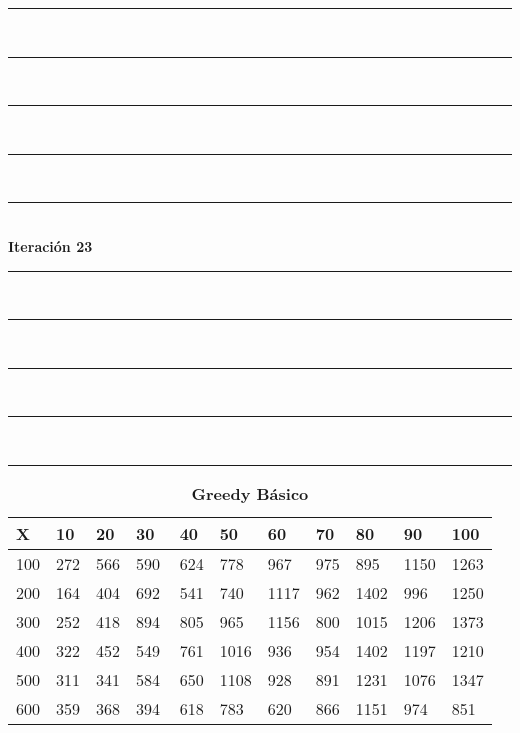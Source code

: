 \documentclass[10pt,letterpaper]{article}
\begin{document}
\newpage 
\begin{center}
\newcommand{\HRule}{\rule{\linewidth}{0.5mm}}
\center
\HRule\\[6cm]
\HRule\\[0.4cm]
\HRule\\[0.4cm]
\HRule\\[0.4cm]
\HRule\\[0.4cm]
{\centering \Huge\bfseries Iteración 23}\\[0.4cm]
\HRule\\[0.4cm]
\HRule\\[0.4cm]
\HRule\\[0.4cm]
\HRule\\[6cm]
\HRule
\end{center}
\newpage 
{}
\begin{center}
\begin{table}\renewcommand{\arraystretch}{2.5}
\caption{\large \textbf{Greedy Básico}}
\centering
\begin{tabular} { |m{0.5cm}|m{1.3cm}|m{1.3cm}|m{1.3cm}|m{1.3cm}|m{1.3cm}|m{1.3cm}|m{1.3cm}|m{1.3cm}|m{1.3cm}|m{1.3cm}|} 
\hline
\rowcolor{Gray}
\centering \textbf{X} & \centering \textbf{10} & \centering \textbf{20} & \centering \textbf{30}\ & \centering \textbf{40} & \centering \textbf{50} & \centering \textbf{60}\ & \centering \textbf{70} & \centering \textbf{80} & \centering \textbf{90}\ & \textbf{100} \\\hline
\cellcolor{Gray}100 & \Large 272 & \Large 566 & \Large 590 & \Large 624 & \Large 778 & \Large 967 & \Large 975 & \Large 895 & \Large 1150 & \Large 1263 \\
\hline
\cellcolor{Gray}200 & \Large 164 & \Large 404 & \Large 692 & \Large 541 & \Large 740 & \Large 1117 & \Large 962 & \Large 1402 & \Large 996 & \Large 1250 \\
\hline
\cellcolor{Gray}300 & \Large 252 & \Large 418 & \Large 894 & \Large 805 & \Large 965 & \Large 1156 & \Large 800 & \Large 1015 & \Large 1206 & \Large 1373 \\
\hline
\cellcolor{Gray}400 & \Large 322 & \Large 452 & \Large 549 & \Large 761 & \Large 1016 & \Large 936 & \Large 954 & \Large 1402 & \Large 1197 & \Large 1210 \\
\hline
\cellcolor{Gray}500 & \Large 311 & \Large 341 & \Large 584 & \Large 650 & \Large 1108 & \Large 928 & \Large 891 & \Large 1231 & \Large 1076 & \Large 1347 \\
\hline
\cellcolor{Gray}600 & \Large 359 & \Large 368 & \Large 394 & \Large 618 & \Large 783 & \Large 620 & \Large 866 & \Large 1151 & \Large 974 & \Large 851 \\

\end{tabular}
\end{table}
\end{center}
\end{document}
